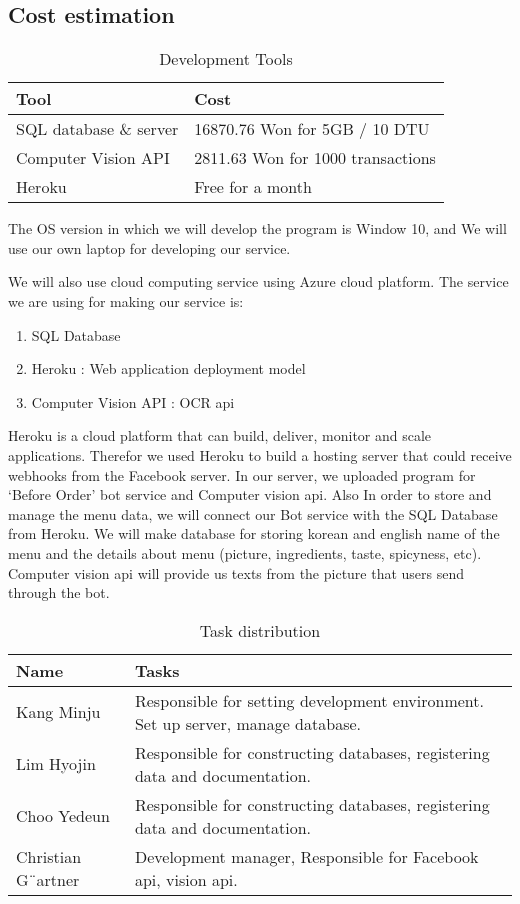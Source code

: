 \subsection{Cost estimation}
\begin{table}[htb]
\caption{Development Tools}
\begin{tabularx}{\linewidth}{|X|X|}
\toprule
Tool & Cost \\
\midrule
SQL database \& server & 16870.76 Won  for 5GB / 10 DTU\\
Computer Vision API & 2811.63 Won for 1000 transactions\\
Heroku & Free for a month
\end{tabularx}
\end{table}
\FloatBarrier

The OS version in which we will develop the program is Window 10, and We will use our own laptop for developing our service.

We will also use cloud computing service using Azure cloud platform. 
The service we are using for making our service is:
\begin{enumerate}
\item SQL Database 
\item Heroku  : Web application deployment model 
\item Computer Vision API : OCR api
\end{enumerate}
Heroku is a cloud platform that can build, deliver, monitor and scale applications. Therefor we used Heroku to build a hosting server that could receive webhooks from the Facebook server. In our server, we uploaded program for ‘Before Order’ bot service and Computer vision api. 
Also In order to store and manage the menu data, we will connect our Bot service with the SQL Database from Heroku. We will make database for storing korean and english name of the menu and the details about menu (picture, ingredients, taste, spicyness, etc).
Computer vision api will provide us texts from the picture that users send through the bot.

\begin{table}[htb]
\caption{Task distribution}
\begin{tabularx}{\linewidth}{|X|X|}
\toprule
Name & Tasks \\
\midrule
Kang Minju  & Responsible for setting development environment. Set up server, manage database.\\
Lim Hyojin & Responsible for constructing databases, registering data and documentation.\\
Choo Yedeun & Responsible for constructing databases, registering data and documentation.\\
Christian G¨artner & Development manager, Responsible for Facebook api, vision api.
\end{tabularx}
\end{table}
\FloatBarrier
